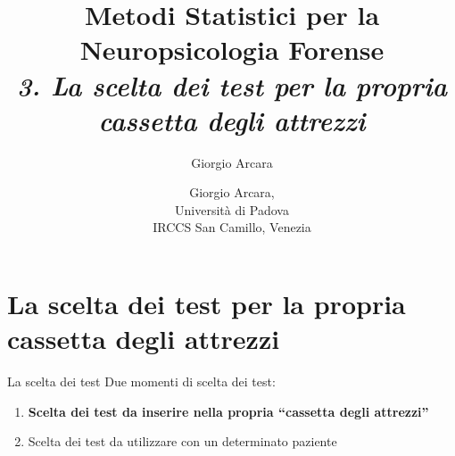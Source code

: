 \documentclass[
  ignorenonframetext,
]{beamer}
\author{Giorgio Arcara}
\date{}
\begin{document}
\begin{frame}
\title{Metodi Statistici per la Neuropsicologia Forense\\ \vspace{1em} \emph{3. La scelta dei test per la propria cassetta degli attrezzi}}
\author{Giorgio Arcara,\\ Università di Padova \\ IRCCS San Camillo, Venezia}

\maketitle
\end{frame}

\section{La scelta dei test per la propria cassetta degli
attrezzi}\label{la-scelta-dei-test-per-la-propria-cassetta-degli-attrezzi}

\begin{frame}{La scelta dei test}
\label{la-scelta-dei-test}
Due momenti di scelta dei test:

\begin{enumerate}[<+->]
[1)]
\item
  \textbf{Scelta dei test da inserire nella propria ``cassetta degli
  attrezzi''}
\item
  Scelta dei test da utilizzare con un determinato paziente
\end{enumerate}
\end{frame}
\end{document}
